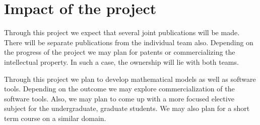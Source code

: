 \documentclass[a4paper,11pt]{article}
\begin{document}






\section{Impact of the project}

Through this project we expect that several joint publications will be made. There will be separate publications from the individual team also. Depending on the progress of the project we may plan for patents or commercializing the intellectual property. In such a case, the ownership will lie with both teams.
 

Through this project we plan to develop mathematical models as well as software tools. Depending on the outcome we may explore commercialization of the software tools. Also, we may plan to come up with a more focused elective subject for the undergraduate, graduate students. We may also plan for a short term course on a similar domain.
\end{document}
